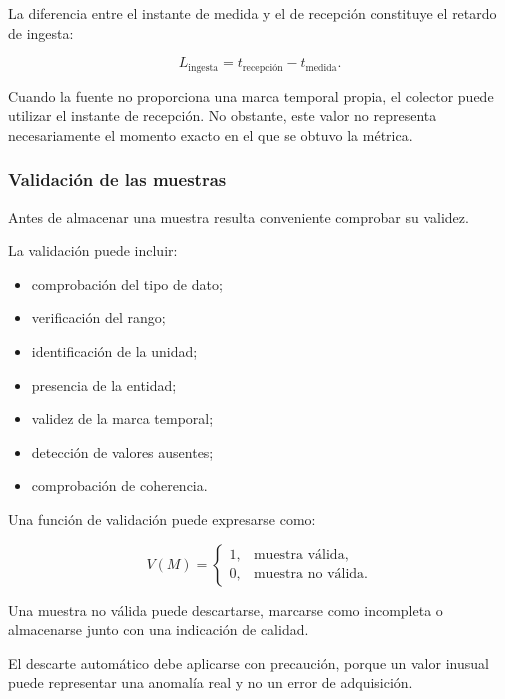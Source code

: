 La diferencia entre el instante de medida y el de recepción constituye
el retardo de ingesta:

\[
    L_{\mathrm{ingesta}}
    =
    t_{\mathrm{recepción}}
    -
    t_{\mathrm{medida}}.
\]

Cuando la fuente no proporciona una marca temporal propia, el colector
puede utilizar el instante de recepción. No obstante, este valor no
representa necesariamente el momento exacto en el que se obtuvo la
métrica.


\subsubsection*{Validación de las muestras}

Antes de almacenar una muestra resulta conveniente comprobar su validez.

La validación puede incluir:

\begin{itemize}
    \item comprobación del tipo de dato;

    \item verificación del rango;

    \item identificación de la unidad;

    \item presencia de la entidad;

    \item validez de la marca temporal;

    \item detección de valores ausentes;

    \item comprobación de coherencia.
\end{itemize}

Una función de validación puede expresarse como:

\[
    V(M)
    =
    \begin{cases}
        1, & \text{muestra válida},\\
        0, & \text{muestra no válida}.
    \end{cases}
\]

Una muestra no válida puede descartarse, marcarse como incompleta o
almacenarse junto con una indicación de calidad.

El descarte automático debe aplicarse con precaución, porque un valor
inusual puede representar una anomalía real y no un error de adquisición.


